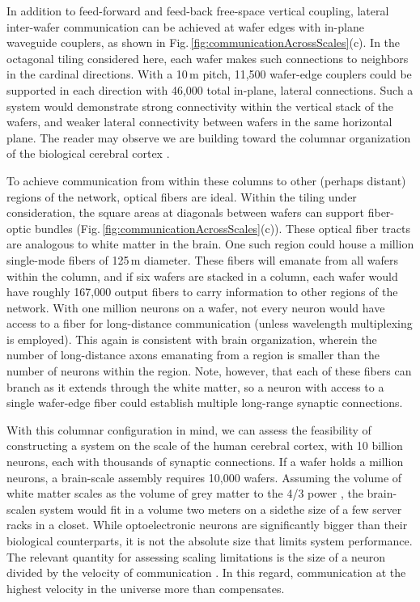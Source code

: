 \documentclass[twocolumn]{article}
\begin{document}
In addition to feed-forward and feed-back free-space vertical coupling, lateral inter-wafer communication can be achieved at wafer edges with in-plane waveguide couplers, as shown in Fig.\,\ref{fig:communicationAcrossScales}(c). In the octagonal tiling considered here, each wafer makes such connections to neighbors in the cardinal directions. With a 10\,\textmu m pitch, 11,500 wafer-edge couplers could be supported in each direction with 46,000 total in-plane, lateral connections. Such a system would demonstrate strong connectivity within the vertical stack of the wafers, and weaker lateral connectivity between wafers in the same horizontal plane. The reader may observe we are building toward the columnar organization of the biological cerebral cortex \cite{mo1997}.

To achieve communication from within these columns to other (perhaps distant) regions of the network, optical fibers are ideal. Within the tiling under consideration, the square areas at diagonals between wafers can support fiber-optic bundles (Fig.\,\ref{fig:communicationAcrossScales}(c)). These optical fiber tracts are analogous to white matter in the brain. One such region could house a million single-mode fibers of 125\,\textmu m diameter. These fibers will emanate from all wafers within the column, and if six wafers are stacked in a column, each wafer would have roughly 167,000 output fibers to carry information to other regions of the network. With one million neurons on a wafer, not every neuron would have access to a fiber for long-distance communication (unless wavelength multiplexing is employed). This again is consistent with brain organization, wherein the number of long-distance axons emanating from a region is smaller than the number of neurons within the region. Note, however, that each of these fibers can branch as it extends through the white matter, so a neuron with access to a single wafer-edge fiber could establish multiple long-range synaptic connections. 

With this columnar configuration in mind, we can assess the feasibility of constructing a system on the scale of the human cerebral cortex, with 10 billion neurons, each with thousands of synaptic connections. If a wafer holds a million neurons, a brain-scale assembly requires 10,000 wafers. Assuming the volume of white matter scales as the volume of grey matter to the 4/3 power \cite{zhse2000}, the brain-scalen system would fit in a volume two meters on a side\textemdash the size of a few server racks in a closet. While optoelectronic neurons are significantly bigger than their biological counterparts, it is not the absolute size that limits system performance. The relevant quantity for assessing scaling limitations is the size of a neuron divided by the velocity of communication \cite{sh2018_ICRC}. In this regard, communication at the highest velocity in the universe more than compensates.
\end{document}

